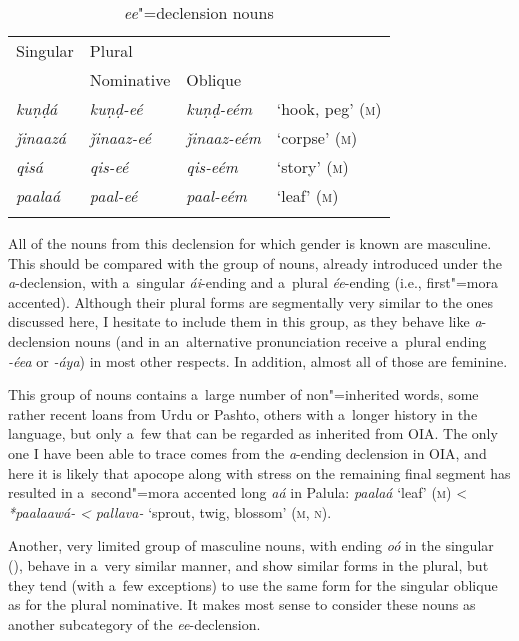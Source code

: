 \begin{table}[ht]
 \label{bkm:Ref193698864}
 \caption{\textit{ee}"=declension nouns}
\begin{tabularx}{\textwidth}{ Q Q Q Q }
\lsptoprule
Singular
&
Plural\\
&
Nominative &
Oblique &
\\\hline
\textit{kuṇḍá} &
\textit{kuṇḍ-eé} &
\textit{kuṇḍ-eém} &
`hook, peg' (\textsc{m})\\
\textit{ǰinaazá} &
\textit{ǰinaaz-eé} &
\textit{ǰinaaz-eém} &
`corpse' (\textsc{m})\\
\textit{qisá} &
\textit{qis-eé} &
\textit{qis-eém} &
`story' (\textsc{m})\\
\textit{paalaá} &
\textit{paal-eé} &
\textit{paal-eém} &
`leaf' (\textsc{m})\\\lspbottomrule
\end{tabularx}
\label{tab:4-18}
\end{table}


All of the nouns from this declension for which gender is known are masculine. This should be compared with the group of nouns, already introduced under the \textit{a}-declension, with a~singular \textit{ái}-ending and a~plural \textit{ée}-ending (i.e., first"=mora accented). Although their plural forms are segmentally very similar to the ones discussed here, I hesitate to include them in this group, as they behave like \textit{a}-declension nouns (and in an~alternative pronunciation receive a~plural ending \textit{-éea} or \textit{-áya}) in most other respects. In addition, almost all of those are feminine.


This group of nouns contains a~large number of non"=inherited words, some rather recent loans from Urdu or Pashto, others with a~longer history in the language, but only a~few that can be regarded as inherited from OIA. The only one I have been able to trace comes from the \textit{a}-ending declension in OIA, and here it is likely that apocope along with stress on the remaining final segment has resulted in a~second"=mora accented long \textit{aá} in Palula: \textit{paalaá} `leaf' (\textsc{m}) {\textless} \textit{*paalaawá-} \textit{{\textless} pallava-} `sprout, twig, blossom' (\textsc{m}, \textsc{n}).


Another, very limited group of masculine nouns, with ending \textit{oó} in the singular (), behave in a~very similar manner, and show similar forms in the plural, but they tend (with a~few exceptions) to use the same form for the singular oblique as for the plural nominative. It makes most sense to consider these nouns as another subcategory of the \textit{ee}-declension.




